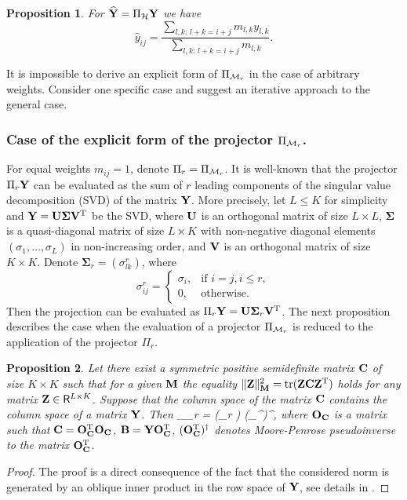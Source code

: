 \documentclass[sii]{ipart}
\DeclareMathOperator{\tr}{tr}
\newtheorem{proposition}{Proposition}
\begin{document}
\begin{proposition}
	For $\widehat{\mathbf{Y}}=\Pi_{\mathcal{H}} \mathbf{Y}$ we have
	\begin{equation*}
	\hat{y}_{ij} = \frac{\sum_{l,k:\, l+k=i+j} m_{l,k} y_{l,k}}{\sum_{l,k:\, l+k=i+j} m_{l,k}}.
	\end{equation*}
\end{proposition}

It is impossible to derive an explicit form of $\Pi_{\mathcal{M}_r}$ in the case of arbitrary weights.
Consider one specific case and suggest an iterative approach to the general case.

\subsubsection{Case of the explicit form of the projector $\Pi_{\mathcal{M}_r}$.}
\label{sec:projMr}
\label{sec:obliqueSVD}
For equal weights $m_{ij}=1$, denote $\Pi_r=\Pi_{\mathcal{M}_r}$.
It is well-known that the projector $\Pi_{r} \mathbf{Y}$ can be evaluated as the sum of $r$ leading components of the singular value decomposition (SVD) of the matrix $\mathbf{Y}$. More precisely, let $L\le K$ for simplicity and $\mathbf{Y} = \mathbf{U} \mathbf{\Sigma} \mathbf{V}^{\mathrm{T}}$ be the SVD, where $\mathbf{U}$ is an orthogonal matrix of size $L \times L$, $\mathbf{\Sigma}$ is a quasi-diagonal matrix of size $L \times K$ with non-negative diagonal elements $(\sigma_1, \ldots, \sigma_L)$ in non-increasing order, and $\mathbf{V}$ is an orthogonal matrix of size $K \times K$. Denote $\mathbf{\Sigma}_r = (\sigma^r_{l k})$, where
\begin{equation*}
\sigma^r_{i j} = \begin{cases}
\sigma_i, & \text{if $i = j, i \le r,$}\\
0, & \text{otherwise}.
\end{cases}
\end{equation*}
Then the projection can be evaluated as $\Pi_{r} \mathbf{Y}  = \mathbf{U} \mathbf{\Sigma}_r \mathbf{V}^{\mathrm{T}}$.
The next proposition describes the case when the evaluation of a projector $\Pi_{\mathcal{M}_r}$ is reduced to the application of the projector $\Pi_r$.

\begin{proposition}
	\label{prop:projS}
	Let there exist a symmetric positive semidefinite matrix $\mathbf{C}$ of size $K \times K$ such that for a given $\mathbf{M}$ the  equality $\|\bfZ\|_\bfM^2 = \tr(\bfZ \bfC \bfZ^\rmT)$ holds for any matrix $\mathbf{Z}\in \mathsf{R}^{L\times K}$.
	Suppose that the column space of the matrix $\mathbf{C}$ contains the column space of a matrix $\mathbf{Y}$.
	Then
	\be
	\label{eq:PiMr}
	\Pi_{\calM_r} \bfY = (\Pi_r \bfB) (\bfO_\bfC^{\rmT})^\dagger,
	\ee
	where $\mathbf{O}_{\mathbf{C}}$ is a matrix such that $\mathbf{C} = \mathbf{O}_{\mathbf{C}}^{\mathrm{T}}\mathbf{O}_{\mathbf{C}}$,
	$\mathbf{B} = \mathbf{Y} \mathbf{O}_{\mathbf{C}}^{\mathrm{T}}$, $(\mathbf{O}_{\mathbf{C}}^{\mathrm{T}})^\dagger$ denotes  Moore-Penrose pseudoinverse to the matrix $\mathbf{O}_{\mathbf{C}}^{\mathrm{T}}$.
\end{proposition}
\begin{proof}
	The proof is a direct consequence of the fact that the considered norm is generated by an oblique inner product in the row space of $\mathbf{Y}$, see details in \cite{Golyandina2013,Allen2014}.
\end{proof}
\end{document}
